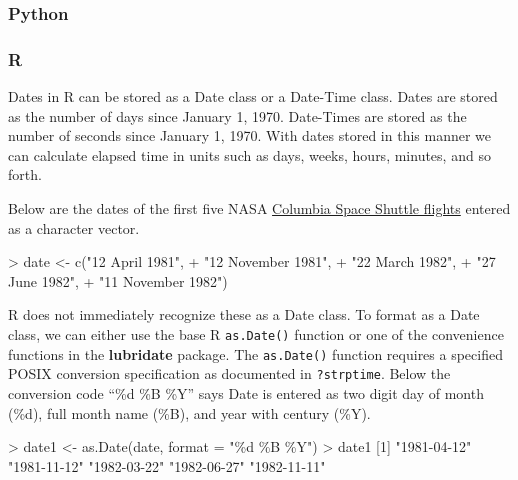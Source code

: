 \documentclass[
]{book}
\newenvironment{Shaded}{\begin{snugshade}}{\end{snugshade}}
\newcommand{\AttributeTok}[1]{\textcolor[rgb]{0.77,0.63,0.00}{#1}}
\newcommand{\DecValTok}[1]{\textcolor[rgb]{0.00,0.00,0.81}{#1}}
\newcommand{\FunctionTok}[1]{\textcolor[rgb]{0.00,0.00,0.00}{#1}}
\newcommand{\NormalTok}[1]{#1}
\newcommand{\OtherTok}[1]{\textcolor[rgb]{0.56,0.35,0.01}{#1}}
\newcommand{\SpecialCharTok}[1]{\textcolor[rgb]{0.00,0.00,0.00}{#1}}
\newcommand{\StringTok}[1]{\textcolor[rgb]{0.31,0.60,0.02}{#1}}
\begin{document}
\hypertarget{python-26}{%
\subsubsection*{Python}\label{python-26}}

\hypertarget{r-26}{%
\subsubsection*{R}\label{r-26}}

Dates in R can be stored as a Date class or a Date-Time class. Dates are stored as the number of days since January 1, 1970. Date-Times are stored as the number of seconds since January 1, 1970. With dates stored in this manner we can calculate elapsed time in units such as days, weeks, hours, minutes, and so forth.

Below are the dates of the first five NASA \href{https://en.wikipedia.org/wiki/List_of_Space_Shuttle_missions\#Shuttle_flights}{Columbia Space Shuttle flights} entered as a character vector.

\begin{Shaded}
\begin{Highlighting}[]
\SpecialCharTok{\textgreater{}}\NormalTok{ date }\OtherTok{\textless{}{-}} \FunctionTok{c}\NormalTok{(}\StringTok{"12 April 1981"}\NormalTok{, }
\SpecialCharTok{+}           \StringTok{"12 November 1981"}\NormalTok{, }
\SpecialCharTok{+}           \StringTok{"22 March 1982"}\NormalTok{, }
\SpecialCharTok{+}           \StringTok{"27 June 1982"}\NormalTok{, }
\SpecialCharTok{+}           \StringTok{"11 November 1982"}\NormalTok{)}
\end{Highlighting}
\end{Shaded}

R does not immediately recognize these as a Date class. To format as a Date class, we can either use the base R \texttt{as.Date()} function or one of the convenience functions in the \textbf{lubridate} package. The \texttt{as.Date()} function requires a specified POSIX conversion specification as documented in \texttt{?strptime}. Below the conversion code ``\%d \%B \%Y'' says Date is entered as two digit day of month (\%d), full month name (\%B), and year with century (\%Y).

\begin{Shaded}
\begin{Highlighting}[]
\SpecialCharTok{\textgreater{}}\NormalTok{ date1 }\OtherTok{\textless{}{-}} \FunctionTok{as.Date}\NormalTok{(date, }\AttributeTok{format =} \StringTok{"\%d \%B \%Y"}\NormalTok{)}
\SpecialCharTok{\textgreater{}}\NormalTok{ date1}
\NormalTok{[}\DecValTok{1}\NormalTok{] }\StringTok{"1981{-}04{-}12"} \StringTok{"1981{-}11{-}12"} \StringTok{"1982{-}03{-}22"} \StringTok{"1982{-}06{-}27"} \StringTok{"1982{-}11{-}11"}
\end{Highlighting}
\end{Shaded}
\end{document}
